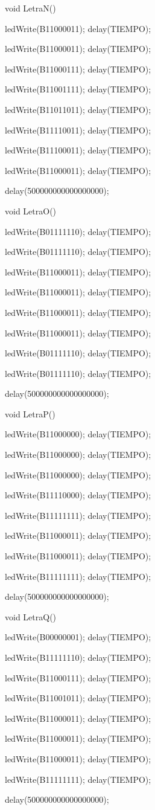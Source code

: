\documentclass{article}
\begin{document}
void LetraN(){
   
   ledWrite(B11000011); delay(TIEMPO);
   
   ledWrite(B11000011); delay(TIEMPO);
   
   ledWrite(B11000111); delay(TIEMPO);
   
   ledWrite(B11001111); delay(TIEMPO);
   
   ledWrite(B11011011); delay(TIEMPO);
   
   ledWrite(B11110011); delay(TIEMPO);
   
   ledWrite(B11100011); delay(TIEMPO);
   
   ledWrite(B11000011); delay(TIEMPO);
  
  delay(500000000000000000);}

void LetraO(){
   
   ledWrite(B01111110); delay(TIEMPO);
   
   ledWrite(B01111110); delay(TIEMPO);
   
   ledWrite(B11000011); delay(TIEMPO);
   
   ledWrite(B11000011); delay(TIEMPO);
   
   ledWrite(B11000011); delay(TIEMPO);
   
   ledWrite(B11000011); delay(TIEMPO);
   
   ledWrite(B01111110); delay(TIEMPO);
   
   ledWrite(B01111110); delay(TIEMPO);
  
  delay(500000000000000000);}

void LetraP(){

   ledWrite(B11000000); delay(TIEMPO);

   ledWrite(B11000000); delay(TIEMPO);

   ledWrite(B11000000); delay(TIEMPO);

   ledWrite(B11110000); delay(TIEMPO);

   ledWrite(B11111111); delay(TIEMPO);

   ledWrite(B11000011); delay(TIEMPO);

   ledWrite(B11000011); delay(TIEMPO);

   ledWrite(B11111111); delay(TIEMPO);

  delay(500000000000000000);}

void LetraQ(){

   ledWrite(B00000001); delay(TIEMPO);

   ledWrite(B11111110); delay(TIEMPO);

   ledWrite(B11000111); delay(TIEMPO);

   ledWrite(B11001011); delay(TIEMPO);

   ledWrite(B11000011); delay(TIEMPO);

   ledWrite(B11000011); delay(TIEMPO);

   ledWrite(B11000011); delay(TIEMPO);

   ledWrite(B11111111); delay(TIEMPO);

   delay(500000000000000000);}
\end{document}
